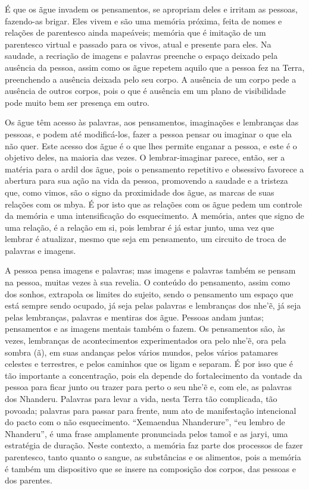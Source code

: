 É que os ãgue invadem os pensamentos, se apropriam deles e irritam as
pessoas, fazendo-as brigar. Eles vivem e são uma memória próxima, feita
de nomes e relações de parentesco ainda mapeáveis; memória que é
imitação de um parentesco virtual e passado para os vivos, atual e
presente para eles. Na saudade, a recriação de imagens e palavras
preenche o espaço deixado pela ausência da pessoa, assim como os ãgue
repetem aquilo que a pessoa fez na Terra, preenchendo a ausência
deixada pelo seu corpo. A ausência de um corpo pede a ausência de
outros corpos, pois o que é ausência em um plano de visibilidade pode
muito bem ser presença em outro. 

Os ãgue têm acesso às palavras, aos pensamentos, imaginações e
lembranças das pessoas, e podem até modificá-los, fazer a pessoa pensar
ou imaginar o que ela não quer. Este acesso dos ãgue é o que lhes
permite enganar a pessoa, e este é o objetivo deles, na maioria das
vezes. O lembrar-imaginar parece, então, ser a matéria para o ardil dos
ãgue, pois o pensamento repetitivo e obsessivo favorece a abertura para
sua ação na vida da pessoa, promovendo a saudade e a tristeza que, como
vimos, são o signo da proximidade dos ãgue, as marcas de suas relações
com os mbya. É por isto que as relações com os ãgue pedem um controle
da memória e uma intensificação do esquecimento. A memória, antes que
signo de uma relação, é a relação em si, pois lembrar é já estar junto,
uma vez que lembrar é atualizar, mesmo que seja em pensamento, um
circuito de troca de palavras e imagens.

A pessoa pensa imagens e palavras; mas imagens e palavras também se
pensam na pessoa, muitas vezes à sua revelia. O conteúdo do pensamento,
assim como dos sonhos, extrapola os limites do sujeito, sendo o
pensamento um espaço que está sempre sendo ocupado, já seja pelas
palavras e lembranças dos nhe’\~{e}, já seja pelas lembranças,
palavras e mentiras dos ãgue. Pessoas andam juntas; pensamentos e as
imagens mentais também o fazem. Os pensamentos são, às vezes, lembranças
de acontecimentos experimentados ora pelo nhe’\~{e}, ora pela sombra
(ã), em suas andanças pelos vários mundos, pelos vários patamares
celestes e terrestres, e pelos caminhos que os ligam e separam. É por
isso que é tão importante a concentração, pois ela depende do
fortalecimento da vontade da pessoa para ficar junto ou trazer para
perto o seu nhe’\~{e} e, com ele, as palavras dos Nhanderu. Palavras
para levar a vida, nesta Terra tão complicada, tão povoada; palavras
para passar para frente, num ato de manifestação intencional do pacto
com o não esquecimento. ``Xemaendua Nhanderure'', ``eu lembro de
Nhanderu'', é uma frase amplamente pronunciada pelos tamo\~{i} e as
jaryi, uma estratégia de duração. Neste contexto, a memória faz parte
dos processos de fazer parentesco, tanto quanto o sangue, as
substâncias e os alimentos, pois a memória é também um dispositivo que
se insere na composição dos corpos, das pessoas e dos parentes.

